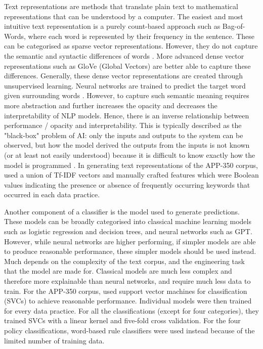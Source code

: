 Text representations are methods that translate plain text to mathematical representations that can be understood by a computer. The easiest and most intuitive text representation is a purely count-based approach such as Bag-of-Words, where each word is represented by their frequency in the sentence. These can be categorised as sparse vector representations. However, they do not capture the semantic and syntactic differences of words \cite{liu2020word}. More advanced dense vector representations such as GloVe (Global Vectors) are better able to capture these differences. Generally, these dense vector representations are created through unsupervised learning. Neural networks are trained to predict the target word given surrounding words \cite{liu2020word}. However, to capture such semantic meaning requires more abstraction and further increases the opacity and decreases the interpretability of NLP models. Hence, there is an inverse relationship between performance / opacity and interpretability.  This is typically described as the "black-box" problem of AI: only the inputs and outputs to the system can be observed, but how the model derived the outputs from the inputs is not known (or at least not easily understood) because it is difficult to know exactly how the model is programmed \cite{zednik2021}. In generating text representations of the APP-350 corpus, \cite{zimmeck2019} used a union of Tf-IDF vectors and manually crafted features which were Boolean values indicating the presence or absence of frequently occurring keywords that occurred in each data practice.

Another component of a classifier is the model used to generate predictions. These models can be broadly categorised into classical machine learning models such as logistic regression and decision trees, and neural networks such as GPT. However, while neural networks are higher performing, if simpler models are able to produce reasonable performance, these simpler models should be used instead. Much depends on the complexity of the text corpus, and the engineering task that the model are made for. Classical models are much less complex and therefore more explainable than neural networks, and require much less data to train. For the APP-350 corpus, \cite{zimmeck2019} used support vector machines for classification (SVCs) to achieve reasonable performance. Individual models were then trained for every data practice. For all the classifications (except for four categories), they trained SVCs with a linear kernel and five-fold cross validation. For the four policy classifications, word-based rule classifiers were used instead because of the limited number of training data.

